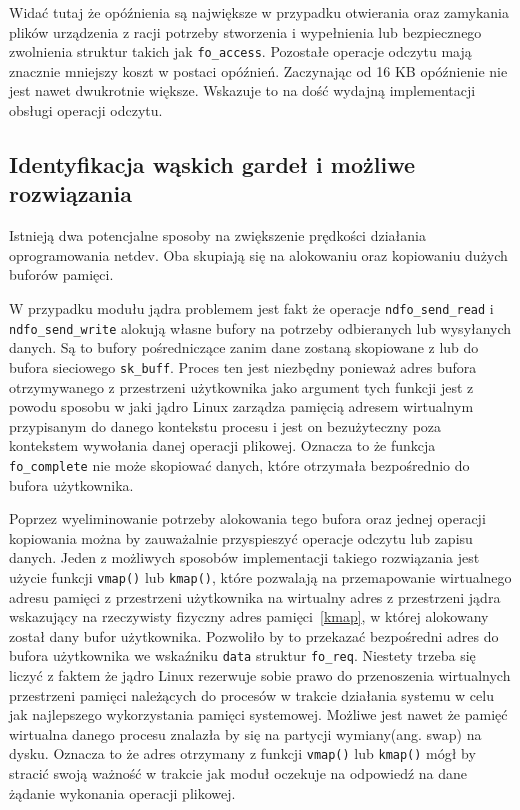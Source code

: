 \documentclass[10pt]{scrartcl}
\begin{document}
Widać tutaj że opóźnienia są największe w przypadku otwierania oraz zamykania plików urządzenia z racji potrzeby stworzenia i wypełnienia lub bezpiecznego zwolnienia struktur takich jak \texttt{fo\_access}. Pozostałe operacje odczytu mają znacznie mniejszy koszt w postaci opóźnień. Zaczynając od 16 KB opóźnienie nie jest nawet dwukrotnie większe. Wskazuje to na dość wydajną implementacji obsługi operacji odczytu.

\subsection{Identyfikacja wąskich gardeł i możliwe rozwiązania}

Istnieją dwa potencjalne sposoby na zwiększenie prędkości działania oprogramowania netdev. Oba skupiają się na alokowaniu oraz kopiowaniu dużych buforów pamięci.

W przypadku modułu jądra problemem jest fakt że operacje \texttt{ndfo\_send\_read} i \texttt{ndfo\_send\_write} alokują własne bufory na potrzeby odbieranych lub wysyłanych danych. Są to bufory pośredniczące zanim dane zostaną skopiowane z lub do bufora sieciowego \texttt{sk\_buff}. Proces ten jest niezbędny ponieważ adres bufora otrzymywanego z przestrzeni użytkownika jako argument tych funkcji jest z powodu sposobu w jaki jądro Linux zarządza pamięcią adresem wirtualnym przypisanym do danego kontekstu procesu i jest on bezużyteczny poza kontekstem wywołania danej operacji plikowej. Oznacza to że funkcja \texttt{fo\_complete} nie może skopiować danych, które otrzymała bezpośrednio do bufora użytkownika.

Poprzez wyeliminowanie potrzeby alokowania tego bufora oraz jednej operacji kopiowania można by zauważalnie przyspieszyć operacje odczytu lub zapisu danych. Jeden z możliwych sposobów implementacji takiego rozwiązania jest użycie funkcji \texttt{vmap()} lub \texttt{kmap()}, które pozwalają na przemapowanie wirtualnego adresu pamięci z przestrzeni użytkownika na wirtualny adres z przestrzeni jądra wskazujący na rzeczywisty fizyczny adres pamięci~\ref{kmap}, w której alokowany został dany bufor użytkownika. Pozwoliło by to przekazać bezpośredni adres do bufora użytkownika we wskaźniku \texttt{data} struktur \texttt{fo\_req}. Niestety trzeba się liczyć z faktem że jądro Linux rezerwuje sobie prawo do przenoszenia wirtualnych przestrzeni pamięci należących do procesów w trakcie działania systemu w celu jak najlepszego wykorzystania pamięci systemowej. Możliwe jest nawet że pamięć wirtualna danego procesu znalazła by się na partycji wymiany(ang. swap) na dysku. Oznacza to że adres otrzymany z funkcji \texttt{vmap()} lub \texttt{kmap()} mógł by stracić swoją ważność w trakcie jak moduł oczekuje na odpowiedź na dane żądanie wykonania operacji plikowej.
\end{document}
